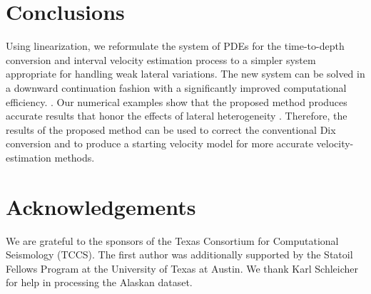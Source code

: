 
\section{Conclusions}
Using linearization, we reformulate the system of PDEs for the time-to-depth conversion and interval velocity estimation process to a simpler system appropriate for handling weak lateral variations. The new system can be solved in a downward continuation fashion with a significantly improved computational efficiency. . Our numerical examples show that the proposed method produces accurate results that honor the effects of lateral heterogeneity . Therefore, the results of the proposed method can be used to correct the conventional Dix conversion and to produce a starting velocity model for more accurate velocity-estimation methods.

\section{Acknowledgements}
 We are grateful to the sponsors of the Texas Consortium for Computational Seismology (TCCS). The first author was additionally supported by the Statoil Fellows Program at the University of Texas at Austin. We thank Karl Schleicher for help in processing the Alaskan dataset.


